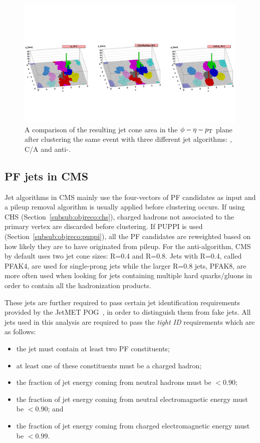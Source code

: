 \begin{figure}[h!] 
    \centering
    \includegraphics[width=0.99\textwidth]{figures/event_reconstruction/clustering_algos.pdf}
    \caption{A comparison of the resulting jet cone area in the $\phi-\eta-p_{\mathrm{T}}$ plane after clustering the same event with three different jet algorithms: \kt, C/A and anti-\kt. ~\cite{Cacciari:2008gp}}
    \label{fig:objreco:jetalgo_comp}
\end{figure}

\subsection{PF jets in CMS}
Jet algorithms in CMS mainly use the four-vectors of PF candidates as input and a pileup removal algorithm is usually applied before clustering occurs. If using CHS (Section~\ref{subsub:objreco:chs}), charged hadrons not associated to the primary vertex are discarded before clustering. If PUPPI is used (Section~\ref{subsub:objreco:puppi}), all the PF candidates are reweighted based on how likely they are to have originated from pileup. 
For the anti-\kt algorithm, CMS by default uses two jet cone sizes: R=0.4 and R=0.8. Jets with R=0.4, called PFAK4, are used for single-prong jets while the larger R=0.8 jets, PFAK8, are more often used when looking for jets containing multiple hard quarks/gluons in order to contain all the hadronization products.\par
 These jets are further required to pass certain jet identification requirements provided by the JetMET POG~\cite{jetID_JME}, in order to distinguish them from fake jets. All jets used in this analysis are required to pass the \textit{tight ID} requirements which are as follows:
\begin{itemize}
  \itemsep0em 
\item the jet must contain at least two PF constituents;
\item at least one of these constituents must be a charged hadron;
\item the fraction of jet energy coming from neutral hadrons must be $< 0.90$;
\item the fraction of jet energy coming from neutral electromagnetic energy must be $< 0.90$; and
\item the fraction of jet energy coming from charged electromagnetic energy must be $< 0.99$.
\end{itemize} 


